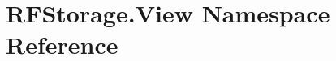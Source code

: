 \hypertarget{namespace_r_f_storage_1_1_view}{}\section{R\+F\+Storage.\+View Namespace Reference}
\label{namespace_r_f_storage_1_1_view}
